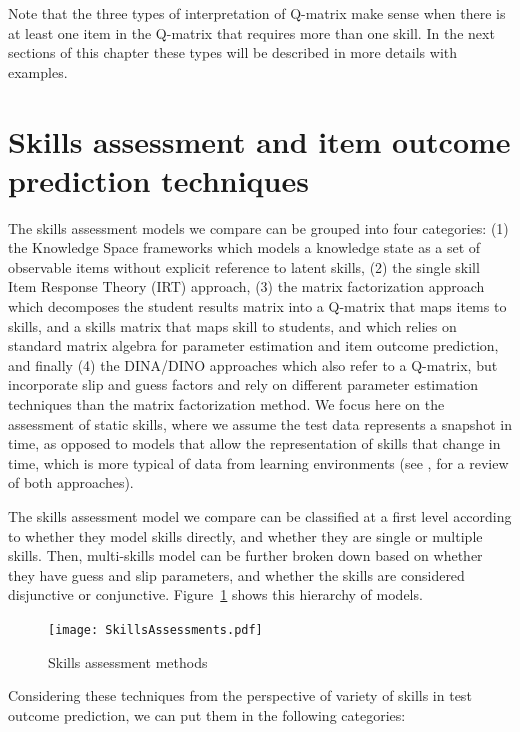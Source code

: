Note that the three types of interpretation of Q-matrix make sense when there is at least one item in the Q-matrix that requires more than one skill. In the next sections of this chapter these types will be described in more details with examples.

\section{Skills assessment and item outcome prediction techniques}

The skills assessment models we compare can be grouped into four categories: (1) the Knowledge Space frameworks which models a knowledge state as a set of observable items without explicit reference to latent skills, (2) the single skill Item Response Theory (IRT) approach, (3) the matrix factorization approach which decomposes the student results matrix into a Q-matrix that maps items to skills, and a skills matrix that maps skill to students, and which relies on standard matrix algebra for parameter estimation and item outcome prediction, and finally (4) the DINA/DINO approaches which also refer to a Q-matrix, but incorporate slip and guess factors and rely on different parameter estimation techniques than the matrix factorization method.  We focus here on the assessment of static skills, where we assume the test data represents a snapshot in time, as opposed to models that allow the representation of skills that change in time, which is more typical of data from learning environments (see \citep{desmarais2012review}, for a review of both approaches).



The skills assessment model we compare can be classified at a first level according to whether they model skills directly, and whether they are single or multiple skills.  Then, multi-skills model can be further broken down based on whether they have guess and slip parameters, and whether the skills are considered disjunctive or conjunctive.  Figure~\ref{AssessMethods} shows this hierarchy of models.

\begin{figure}[ht]
\centering
   \texttt{[image: SkillsAssessments.pdf]}
\caption{Skills assessment methods}
\label{AssessMethods}
\end{figure}

Considering  these techniques from the perspective of variety of skills in test outcome prediction, we can put them in the following categories: 

